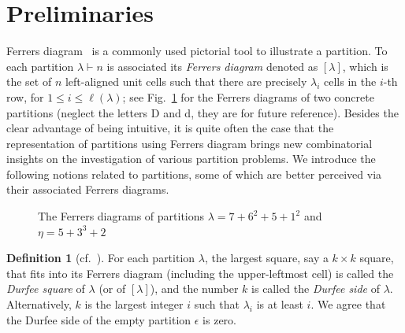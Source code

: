 \documentclass[11pt,reqno]{amsart}
\numberwithin{equation}{section}
\theoremstyle{plain}
\theoremstyle{definition}
\newtheorem{Def}[theorem]{Definition}
\theoremstyle{named}
\def\la{\lambda}
\begin{document}
\section{Preliminaries}\label{sec:pre}

Ferrers diagram~\cite[Chap.~1.3]{andtp} is a commonly used pictorial tool to illustrate a partition. To each partition $\lambda \vdash n$ is associated its {\it Ferrers diagram} denoted as $[\lambda]$, which is the set of $n$ left-aligned unit cells such that there are precisely $\lambda_i$ cells in the $i$-th row, for $1\le i\le \ell(\lambda)$; see Fig.~\ref{fig:Ferrers} for the Ferrers diagrams of two concrete partitions (neglect the letters D and d, they are for future reference). Besides the clear advantage of being intuitive, it is quite often the case that the representation of partitions using Ferrers diagram brings new combinatorial insights on the investigation of various partition problems. We introduce the following notions related to partitions, some of which are better perceived via their associated Ferrers diagrams.

\begin{figure}[ht]
\begin{ferrers}

\addtext{1.5}{-3}{$\la$}
\putright
{}
\end{ferrers}
\caption{The Ferrers diagrams of partitions $\lambda=7+6^2+5+1^2$ and $\eta=5+3^3+2$}
\label{fig:Ferrers}
\end{figure}

\begin{Def}[{cf.~\cite[Chap.~2.3]{andtp}}]\label{def:Durfee}
For each partition $\la$, the largest square, say a $k\times k$ square, that fits into its Ferrers diagram (including the upper-leftmost cell) is called the {\it Durfee square} of $\la$ (or of $[\la]$), and the number $k$ is called the {\it Durfee side} of $\la$. Alternatively, $k$ is the largest integer $i$ such that $\lambda_i$ is at least $i$. We agree that the Durfee side of the empty partition $\epsilon$ is zero.
\end{Def}
\end{document}
